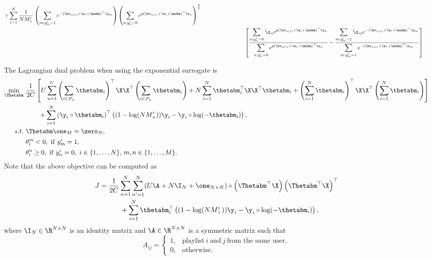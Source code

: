 \begin{equation*}
\begin{aligned}
  + \sum_{i=1}^N \frac{1}{N M_+^i} 
    \left( \sum_{m: y_m^i = 1} e^{-(\bv_{u(i)} + \w_i + \mubm)^\top \x_m} \right)
    \left( \sum_{n: y_n^i = 0} e^{p (\bv_{u(i)} + \w_i + \mubm)^\top \x_n} \right)^\frac{1}{p} \\
& \hspace{8em} \left[ 
    \frac{ \displaystyle \sum_{n: y_n^i = 0} \x_n e^{p (\bv_{u(i)} + \w_i + \mubm)^\top \x_n} }
         { \displaystyle \sum_{n: y_n^i = 0} e^{p (\bv_{u(i)} + \w_i + \mubm)^\top \x_n} }
    - \frac{ \displaystyle \sum_{m: y_m^i = 1} \x_m e^{-(\bv_{u(i)} + \w_i + \mubm)^\top \x_m} }
           { \displaystyle \sum_{m: y_m^i = 1} e^{-(\bv_{u(i)} + \w_i + \mubm)^\top \x_m} } \right]
\end{aligned}
\end{equation*}


The Lagrangian dual problem when using the exponential surrogate is
\begin{equation}
\label{eq:dual_nsr}
\begin{aligned}
\min_{\Thetabm} \ & \frac{1}{2 C} \left[
     U \sum_{u=1}^U \left( \sum_{i \in P_u} \thetabm_i \right)^\top \X \X^\top \left( \sum_{i \in P_u} \thetabm_i \right)
   + N \sum_{i=1}^N \thetabm_i^\top \X \X^\top \thetabm_i
   + \left( \sum_{i=1}^N \thetabm_i \right)^\top \X \X^\top \left( \sum_{i=1}^N \thetabm_i \right) \right] \\
& \hspace{2em}
   + \sum_{i=1}^N \left( \y_i \circ \thetabm_i \right)^\top \left( (1 - \log(N M_+^i)) \y_i - \y_i \circ \log(-\thetabm_i) \right), \\
s.t. \ 
& \Thetabm \one_M = \zero_N, \\
& \theta_i^m < 0, \ \mathrm{if} \ y_m^i = 1, \\
& \theta_i^n \ge 0, \ \mathrm{if} \ y_n^i = 0, \ i \in \{1,\dots,N\}, \, m,n \in \{1,\dots,M\}.
\end{aligned}
\end{equation}
Note that the above objective can be computed as
\begin{equation*}
\begin{aligned}
J &= \frac{1}{2 C} \sum_{n=1}^N \sum_{n'=1}^N (U \A + N \I_N + \one_{N \times N}) 
     \circ \left( \Thetabm^\top \X \right) \left( \Thetabm^\top \X \right)^\top \\
& \hspace{3em}
     + \sum_{i=1}^N \thetabm_i^\top \left( (1 - \log(N M_+^i)) \y_i - \y_i \circ \log(-\thetabm_i) \right),
\end{aligned}
\end{equation*}
where $\I_N \in \R^{N \times N}$ is an identity matrix and $\A \in \R^{N \times N}$ is a symmetric matrix such that
\begin{equation*}
A_{ij} = 
\begin{cases}
1, & \text{playlist} \ i \ \text{and} \ j \ \text{from the same user}, \\
0, & \text{otherwise}.
\end{cases}
\end{equation*}

